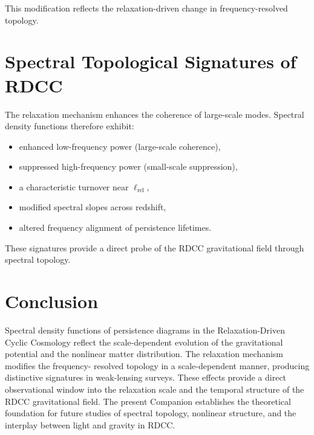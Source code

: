 \documentclass[11pt,a4paper]{article}
\begin{document}
This modification reflects the relaxation-driven change in frequency-resolved 
topology.
\section{Spectral Topological Signatures of RDCC}

The relaxation mechanism enhances the coherence of large-scale modes. Spectral 
density functions therefore exhibit:

\begin{itemize}
    \item enhanced low-frequency power (large-scale coherence),
    \item suppressed high-frequency power (small-scale suppression),
    \item a characteristic turnover near $\ell_{\mathrm{rel}}$,
    \item modified spectral slopes across redshift,
    \item altered frequency alignment of persistence lifetimes.
\end{itemize}

These signatures provide a direct probe of the RDCC gravitational field through 
spectral topology.
\section{Conclusion}

Spectral density functions of persistence diagrams in the Relaxation-Driven Cyclic 
Cosmology reflect the scale-dependent evolution of the gravitational potential and 
the nonlinear matter distribution. The relaxation mechanism modifies the frequency-
resolved topology in a scale-dependent manner, producing distinctive signatures in 
weak-lensing surveys. These effects provide a direct observational window into the 
relaxation scale and the temporal structure of the RDCC gravitational field. The 
present Companion establishes the theoretical foundation for future studies of 
spectral topology, nonlinear structure, and the interplay between light and gravity 
in RDCC.


\nocite{*}

\end{document}
